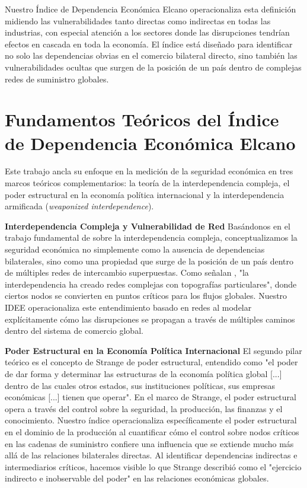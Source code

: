 \documentclass[final,1p,times,authoryear]{elsarticle}
\begin{document}
Nuestro Índice de Dependencia Económica Elcano operacionaliza esta definición midiendo las vulnerabilidades tanto directas como indirectas en todas las industrias, con especial atención a los sectores donde las disrupciones tendrían efectos en cascada en toda la economía. El índice está diseñado para identificar no solo las dependencias obvias en el comercio bilateral directo, sino también las vulnerabilidades ocultas que surgen de la posición de un país dentro de complejas redes de suministro globales.

\section{Fundamentos Teóricos del Índice de Dependencia Económica Elcano}

Este trabajo ancla su enfoque en la medición de la seguridad económica en tres marcos teóricos complementarios: la teoría de la interdependencia compleja, el poder estructural en la economía política internacional y la interdependencia armificada (\textit{weaponized interdependence}).

\textbf{Interdependencia Compleja y Vulnerabilidad de Red}
Basándonos en el trabajo fundamental de \cite{keohane1977power} sobre la interdependencia compleja, conceptualizamos la seguridad económica no simplemente como la ausencia de dependencias bilaterales, sino como una propiedad que surge de la posición de un país dentro de múltiples redes de intercambio superpuestas. Como señalan \cite{farrell2019weaponized}, "la interdependencia ha creado redes complejas con topografías particulares", donde ciertos nodos se convierten en puntos críticos para los flujos globales. Nuestro IDEE operacionaliza este entendimiento basado en redes al modelar explícitamente cómo las disrupciones se propagan a través de múltiples caminos dentro del sistema de comercio global.

\textbf{Poder Estructural en la Economía Política Internacional}
El segundo pilar teórico es el concepto de Strange \citeyear{strange1988states} de poder estructural, entendido como "el poder de dar forma y determinar las estructuras de la economía política global [...] dentro de las cuales otros estados, sus instituciones políticas, sus empresas económicas [...] tienen que operar". En el marco de Strange, el poder estructural opera a través del control sobre la seguridad, la producción, las finanzas y el conocimiento. Nuestro índice operacionaliza específicamente el poder estructural en el dominio de la producción al cuantificar cómo el control sobre nodos críticos en las cadenas de suministro confiere una influencia que se extiende mucho más allá de las relaciones bilaterales directas. Al identificar dependencias indirectas e intermediarios críticos, hacemos visible lo que Strange describió como el "ejercicio indirecto e inobservable del poder" en las relaciones económicas globales.
\end{document}
